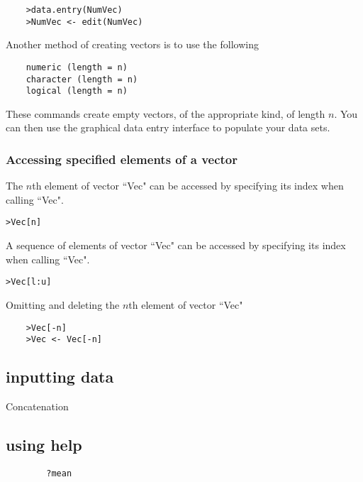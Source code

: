 \documentclass[a4paper,12pt]{article}
\begin{document}
	\begin{verbatim}
	>data.entry(NumVec)
	>NumVec <- edit(NumVec)
	\end{verbatim}
	
	Another method of creating vectors is to use the following
	\begin{verbatim}
	numeric (length = n)
	character (length = n)
	logical (length = n)
	\end{verbatim}
	These commands create empty vectors, of the appropriate kind, of length $n$. You can then use the graphical data entry interface to populate your data sets.
	
	\subsubsection{Accessing specified elements of a vector}
	
	The $n$th element of vector ``Vec" can be accessed by specifying its index when
	calling ``Vec".
	\begin{verbatim}>Vec[n]
	\end{verbatim}
	A sequence of  elements of vector ``Vec" can be accessed by specifying its index
	when calling ``Vec".
	\begin{verbatim}>Vec[l:u]
	\end{verbatim}
	Omitting and deleting the $n$th element of vector ``Vec"
	\begin{verbatim}
	>Vec[-n]
	>Vec <- Vec[-n]
	\end{verbatim}
	
	
	
	\subsection{inputting data}
	Concatenation
	
	\subsection{using help}
	
	\begin{framed}
		\begin{verbatim}
		?mean
		\end{verbatim}
	\end{framed}
	
	
\end{document}
